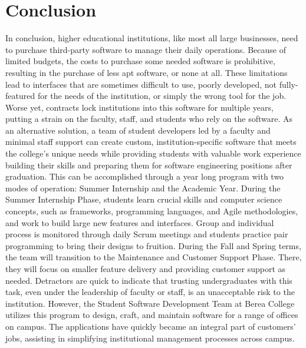 \section{Conclusion}
In conclusion, higher educational institutions, like most all large businesses, need to purchase third-party software to manage their daily operations. Because of limited budgets, the costs to purchase some needed software is prohibitive, resulting in the purchase of less apt software, or none at all. These limitations lead to interfaces that are sometimes difficult to use, poorly developed, not fully-featured for the needs of the institution, or simply the wrong tool for the job. Worse yet, contracts lock institutions into this software for multiple years, putting a strain on the faculty, staff, and students who rely on the software. As an alternative solution, a team of student developers led by a faculty and minimal staff support can create custom, institution-specific software that meets the college's unique needs while providing students with valuable work experience building their skills and preparing them for software engineering positions after graduation. This can be accomplished through a year long program with two modes of operation: Summer Internship and the Academic Year. During the Summer Internship Phase, students learn crucial skills and computer science concepts, such as frameworks, programming languages, and Agile methodologies, and work to build large new features and interfaces. Group and individual process is monitored through daily Scrum meetings and students practice pair programming to bring their designs to fruition. During the Fall and Spring terms, the team will transition to the Maintenance and Customer Support Phase. There, they will focus on smaller feature delivery and providing customer support as needed. Detractors are quick to indicate that trusting undergraduates with this task, even under the leadership of faculty or staff, is an unacceptable risk to the institution. However, the Student Software Development Team at Berea College utilizes this program to design, craft, and maintain software for a range of offices on campus. The applications have quickly became an integral part of customers' jobs, assisting in simplifying institutional management processes across campus.

